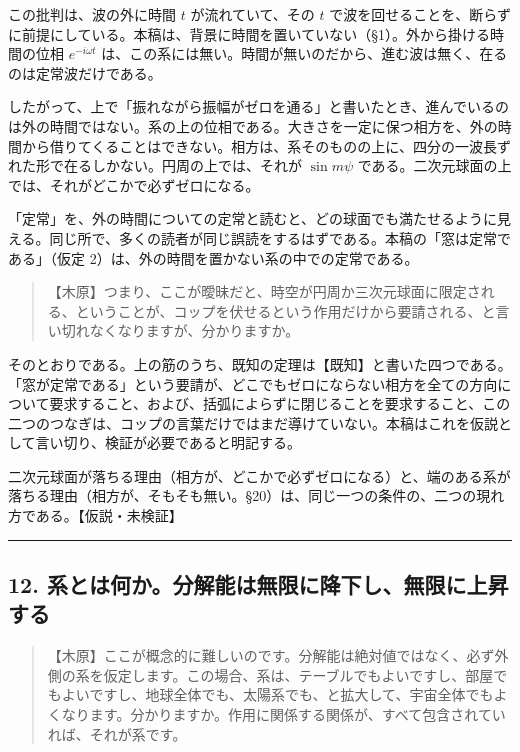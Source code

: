 \documentclass[
  a4paper,
]{ltjsarticle}
\begin{document}
この批判は、波の外に時間 \(t\) が流れていて、その \(t\)
で波を回せることを、断らずに前提にしている。本稿は、背景に時間を置いていない（§1）。外から掛ける時間の位相
\(e^{-i\omega t}\)
は、この系には無い。時間が無いのだから、進む波は無く、在るのは定常波だけである。

したがって、上で「振れながら振幅がゼロを通る」と書いたとき、進んでいるのは外の時間ではない。系の上の位相である。大きさを一定に保つ相方を、外の時間から借りてくることはできない。相方は、系そのものの上に、四分の一波長ずれた形で在るしかない。円周の上では、それが
\(\sin m\psi\)
である。二次元球面の上では、それがどこかで必ずゼロになる。

「定常」を、外の時間についての定常と読むと、どの球面でも満たせるように見える。同じ所で、多くの読者が同じ誤読をするはずである。本稿の「窓は定常である」（仮定
2）は、外の時間を置かない系の中での定常である。

\begin{quote}
【木原】つまり、ここが曖昧だと、時空が円周か三次元球面に限定される、ということが、コップを伏せるという作用だけから要請される、と言い切れなくなりますが、分かりますか。
\end{quote}

そのとおりである。上の筋のうち、既知の定理は【既知】と書いた四つである。「窓が定常である」という要請が、どこでもゼロにならない相方を全ての方向について要求すること、および、括弧によらずに閉じることを要求すること、この二つのつなぎは、コップの言葉だけではまだ導けていない。本稿はこれを仮説として言い切り、検証が必要であると明記する。

二次元球面が落ちる理由（相方が、どこかで必ずゼロになる）と、端のある系が落ちる理由（相方が、そもそも無い。§20）は、同じ一つの条件の、二つの現れ方である。【仮説・未検証】

\begin{center}\rule{0.5\linewidth}{0.5pt}\end{center}

\subsection{12.
系とは何か。分解能は無限に降下し、無限に上昇する}\label{ux7cfbux3068ux306fux4f55ux304bux5206ux89e3ux80fdux306fux7121ux9650ux306bux964dux4e0bux3057ux7121ux9650ux306bux4e0aux6607ux3059ux308b}

\begin{quote}
【木原】ここが概念的に難しいのです。分解能は絶対値ではなく、必ず外側の系を仮定します。この場合、系は、テーブルでもよいですし、部屋でもよいですし、地球全体でも、太陽系でも、と拡大して、宇宙全体でもよくなります。分かりますか。作用に関係する関係が、すべて包含されていれば、それが系です。
\end{quote}
\end{document}
